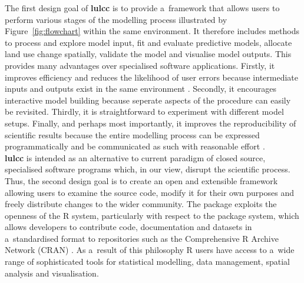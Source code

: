\documentclass{icldt}\usepackage[]{graphicx}\usepackage[]{color}
\begin{document}
The first design goal of \textbf{lulcc} is to provide a~framework that allows users to perform various stages of the modelling process illustrated by Figure~\ref{fig:flowchart} within the same environment. It therefore includes methods to process and explore model input, fit and evaluate predictive models, allocate land use change spatially, validate the model and visualise model outputs. This provides many advantages over specialised software applications. Firstly, it improves efficiency and reduces the likelihood of user errors because intermediate inputs and outputs exist in the same environment \citep{fiske2011,pebesma2012}. Secondly, it encourages interactive model building because seperate aspects of the procedure can easily be revisited. Thirdly, it is straightforward to experiment with different model setups. Finally, and perhaps most importantly, it improves the reproducibility of scientific results because the entire modelling process can be expressed programmatically and be communicated as such with reasonable effort \citep{pebesma2012}. \\ 

\textbf{lulcc} is intended as an alternative to current paradigm of closed source, specialised software programs which, in our view, disrupt the scientific process. Thus, the second design goal is to create an open and extensible framework allowing users to examine the source code, modify it for their own purposes and freely distribute changes to the wider community. The package exploits the openness of the R system, particularly with respect to the package system, which allows developers to contribute code, documentation and datasets in a~standardised format to repositories such as the Comprehensive R Archive Network (CRAN) \citep{pebesma2012,claes2014}. As a~result of this philosophy R users have access to a~wide range of sophisticated tools for statistical modelling, data management, spatial analysis and visualisation. \\
\end{document}
